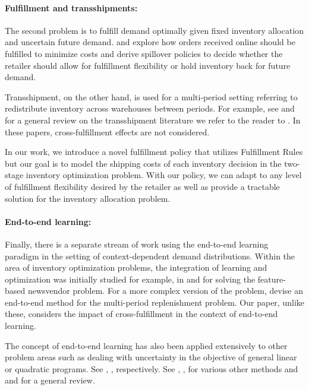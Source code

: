 \documentclass[poms,final,blindrev]{poms1_V1} %
\begin{document}
\paragraph{Fulfillment and transshipments:} The second problem is to fulfill demand optimally given fixed inventory allocation and uncertain future demand.
 \cite{acimovic2015making} and \cite{acimovic2019fulfillment} explore how orders received online should be fulfilled to minimize costs and \cite{devalve2021understanding} derive spillover policies to decide whether the retailer should allow for fulfillment flexibility or hold inventory back for future demand. 

Transshipment, on the other hand, is used for a multi-period setting referring to redistribute inventory across warehouses between periods. For example, see \cite{mieghem2002newsvendor} and for a general review on the transshipment literature we refer to the reader to \cite{chiou2008transshipment}. In these papers, 
cross-fulfillment effects are not considered.  
 

In our work, we introduce a novel fulfillment policy that utilizes Fulfillment Rules but our goal is to model the shipping costs of each inventory decision in the two-stage inventory optimization problem. With our policy, we can adapt to any level of fulfillment flexibility desired by the retailer as well as provide a tractable solution for the inventory allocation problem. 


\paragraph{End-to-end learning:} Finally, there is a separate stream of work using the end-to-end learning paradigm in the setting of context-dependent demand distributions. Within the area of inventory optimization problems, the integration of learning and optimization was initially studied for example, in \cite{Ban2019} and \cite{oroojlooyjadid2020applying} for solving the feature-based newsvendor problem. 
For a more complex version of the problem, \cite{qi2020practical} devise an end-to-end method for the multi-period replenishment problem. Our paper, unlike these, considers the impact of cross-fulfillment in the context of end-to-end learning.

The concept of end-to-end learning has also been applied extensively to other problem areas such as dealing with uncertainty in the objective of general linear or quadratic programs. See \cite{elmachtoub2022smart}, \cite{optnet}, respectively. See \cite{poganvcic2020differentiation}, \cite{berthet2020learning}, \cite{cristian2023end} for various other methods and  and \cite{survey} for a general review.
\end{document}
